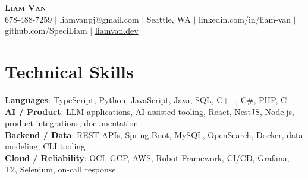 \documentclass[letterpaper,11pt]{article}
\begin{document}

%
\begin{center}
    \textbf{\Huge \scshape Liam Van} \\ \vspace{1pt}
    \small 678-488-7259 $|$ \small {liamvanpj@gmail.com} $|$ Seattle, WA
 {{$|$ linkedin.com/in/liam-van} {$|$ github.com/SpeciLiam} {$|$ \href{https://liamvan.dev}{liamvan.dev}}}

\end{center}

\section{Technical Skills}
 \begin{itemize}[leftmargin=0.15in, label={}]
    \small{\item{
     \textbf{Languages}{: TypeScript, Python, JavaScript, Java, SQL, C++, C\#, PHP, C} \\
     \textbf{AI / Product}{: LLM applications, AI-assisted tooling, React, NestJS, Node.js, product integrations, documentation} \\
     \textbf{Backend / Data}{: REST APIs, Spring Boot, MySQL, OpenSearch, Docker, data modeling, CLI tooling} \\
     \textbf{Cloud / Reliability}{: OCI, GCP, AWS, Robot Framework, CI/CD, Grafana, T2, Selenium, on-call response} \\
    }}
 \end{itemize}
%

\end{document}

